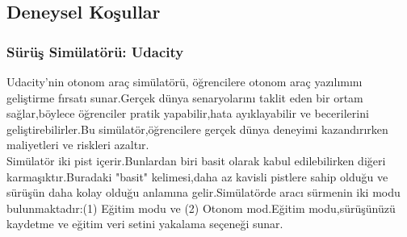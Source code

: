 \documentclass{article}
\begin{document}
\subsection{Deneysel Koşullar}
\subsubsection{Sürüş Simülatörü: Udacity}
Udacity'nin otonom araç simülatörü\cite{Udacity}, öğrencilere otonom araç yazılımını geliştirme fırsatı sunar.Gerçek dünya senaryolarını taklit eden bir ortam sağlar,böylece öğrenciler pratik yapabilir,hata ayıklayabilir ve becerilerini geliştirebilirler.Bu simülatör,öğrencilere gerçek dünya deneyimi kazandırırken maliyetleri ve riskleri azaltır.\\[2pt]
Simülatör iki pist içerir.Bunlardan biri basit olarak kabul edilebilirken diğeri karmaşıktır.Buradaki "basit" kelimesi,daha az kavisli pistlere sahip olduğu ve sürüşün daha kolay olduğu anlamına gelir.Simülatörde aracı sürmenin iki modu bulunmaktadır:(1) Eğitim modu ve (2) Otonom mod.Eğitim modu,sürüşünüzü kaydetme ve eğitim veri setini yakalama seçeneği sunar.\\[1pt]
\end{document}

